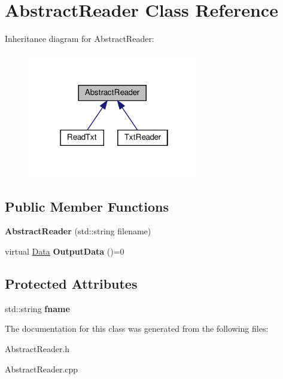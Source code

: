\hypertarget{classAbstractReader}{}\section{Abstract\+Reader Class Reference}
\label{classAbstractReader}


Inheritance diagram for Abstract\+Reader\+:
\nopagebreak
\begin{figure}[H]
\begin{center}
\leavevmode
\includegraphics[width=214pt]{classAbstractReader__inherit__graph}
\end{center}
\end{figure}
\subsection*{Public Member Functions}
\begin{DoxyCompactItemize}
\item 
\mbox{\label{classAbstractReader_af7d4391a1d75538c6bb406c00acabd30}} 
{\bfseries Abstract\+Reader} (std\+::string filename)
\item 
\mbox{\label{classAbstractReader_a14b05f156920be0cfa0cabdb1c6c1267}} 
virtual \hyperlink{structData}{Data} {\bfseries Output\+Data} ()=0
\end{DoxyCompactItemize}
\subsection*{Protected Attributes}
\begin{DoxyCompactItemize}
\item 
\mbox{\label{classAbstractReader_a143f9961ba8aca61c32234a042e466ce}} 
std\+::string {\bfseries fname}
\end{DoxyCompactItemize}


The documentation for this class was generated from the following files\+:\begin{DoxyCompactItemize}
\item 
Abstract\+Reader.\+h\item 
Abstract\+Reader.\+cpp\end{DoxyCompactItemize}
